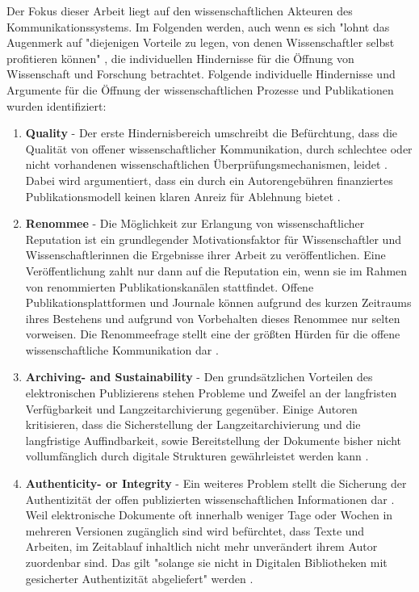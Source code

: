 Der Fokus dieser Arbeit liegt auf den wissenschaftlichen Akteuren des Kommunikationssystems. Im Folgenden werden, auch wenn es sich "lohnt das Augenmerk auf "diejenigen Vorteile zu legen, von denen Wissenschaftler selbst profitieren können" \cite{muller_2010_open}, die individuellen Hindernisse für die Öffnung von Wissenschaft und Forschung betrachtet. Folgende individuelle Hindernisse und Argumente für die Öffnung der wissenschaftlichen Prozesse und Publikationen wurden identifiziert:
\begin{enumerate}
\item \textbf{Quality} - Der erste Hindernisbereich umschreibt die Befürchtung, dass die Qualität von offener wissenschaftlicher Kommunikation, durch schlechtee oder nicht vorhandenen wissenschaftlichen Überprüfungsmechanismen, leidet \cite{Chibnik_2015} \cite{Beall_2012}. Dabei wird argumentiert, dass ein durch ein Autorengebühren finanziertes Publikationsmodell keinen klaren Anreiz für Ablehnung bietet \cite{suchen}.
\item \textbf{Renommee} - Die Möglichkeit zur Erlangung von wissenschaftlicher Reputation ist ein grundlegender Motivationsfaktor für Wissenschaftler und Wissenschaftlerinnen die Ergebnisse ihrer Arbeit zu veröffentlichen. Eine Veröffentlichung zahlt nur dann auf die Reputation ein, wenn sie im Rahmen von renommierten Publikationskanälen stattfindet. Offene Publikationsplattformen und Journale können aufgrund des kurzen Zeitraums ihres Bestehens und aufgrund von Vorbehalten dieses Renommee nur selten vorweisen. Die Renommeefrage stellt eine der größten Hürden für die offene wissenschaftliche Kommunikation dar \cite{weishaupt_2009_goldenOA} \cite{Woelfle_2011}.
\item \textbf{Archiving- and Sustainability} - Den grundsätzlichen Vorteilen des elektronischen Publizierens stehen Probleme und Zweifel an der langfristen Verfügbarkeit und Langzeitarchivierung \cite{weishaupt_2009_goldenOA} gegenüber. Einige Autoren kritisieren, dass die Sicherstellung der Langzeitarchivierung und die langfristige Auffindbarkeit, sowie Bereitstellung der Dokumente bisher nicht vollumfänglich durch digitale Strukturen gewährleistet werden kann \cite{umstatter_2007_qualitatssicherung} \cite{Gersmann_2007}.
\item \textbf{Authenticity- or Integrity} - Ein weiteres Problem stellt die Sicherung der Authentizität der offen publizierten wissenschaftlichen Informationen dar \cite{umstatter_2007_qualitatssicherung} \cite{weishaupt_2009_goldenOA} \cite{grand_2012_open}. Weil elektronische Dokumente oft innerhalb weniger Tage oder Wochen in mehreren Versionen zugänglich sind wird befürchtet, dass Texte und Arbeiten, im Zeitablauf inhaltlich nicht mehr unverändert ihrem Autor zuordenbar sind. Das gilt "solange sie nicht in Digitalen Bibliotheken mit gesicherter Authentizität abgeliefert" werden \cite{umstatter_2007_qualitatssicherung}.

\end{enumerate}
